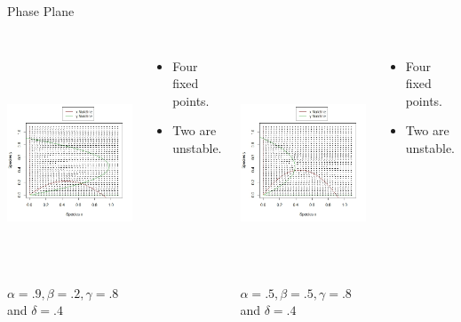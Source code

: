 \begin{frame}{Phase Plane}
\begin{columns}
     {
      \includegraphics[height=7cm]{img/Rplot2} 
      $\alpha = .9, \beta = .2, \gamma = .8$ and $\delta = .4$
      \begin{itemize}
      \item Four fixed points.
      \item Two are unstable.
      \end{itemize}
    }

     {
      \includegraphics[height=7cm]{img/Rplot3} 
      $\alpha = .5, \beta = .5, \gamma = .8$ and $\delta = .4$ 
      \begin{itemize}
      \item Four fixed points.
      \item Two are unstable.
      \end{itemize}
    }


\end{columns}
\end{frame}
